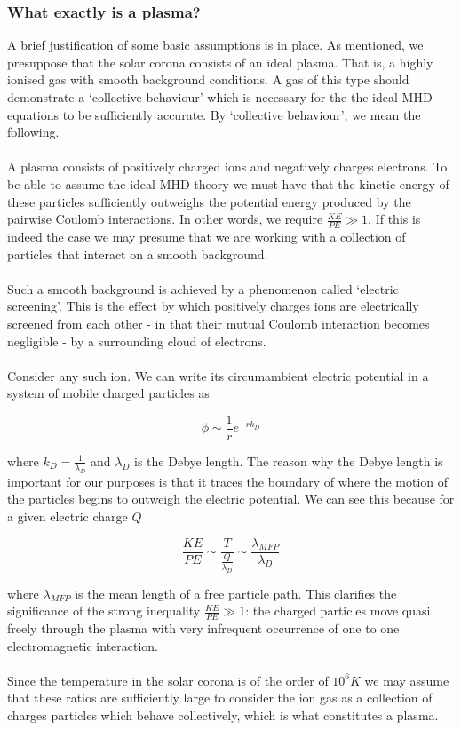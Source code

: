 \subsubsection{What exactly is a plasma?}

A brief justification of some basic assumptions is in place. As mentioned, we presuppose that the solar corona consists of an ideal plasma. That is, a highly ionised gas with smooth background conditions. A gas of this type should demonstrate a `collective behaviour' which is necessary for the the ideal MHD equations to be sufficiently accurate. By `collective behaviour', we mean the following.\\
\\
A plasma consists of positively charged ions and negatively charges electrons. To be able to assume the ideal MHD theory we must have that the kinetic energy of these particles sufficiently outweighs the potential energy produced by the pairwise Coulomb interactions. In other words, we require $\frac{KE}{PE} \gg 1$. If this is indeed the case we may presume that we are working with a collection of particles that interact on a smooth background.\\
\\
Such a smooth background is achieved by a phenomenon called `electric screening'. This is the effect by which positively charges ions are electrically screened from each other - in that their mutual Coulomb interaction becomes negligible - by a surrounding cloud of electrons.\\
\\
Consider any such ion. We can write its circumambient electric potential in a system of mobile charged particles as 

$$ \phi  \sim \frac{1}{r} e^{-r k_D}$$

where $k_D = \frac{1}{\lambda_D}$ and $ \lambda_D $ is the Debye length. The reason why the Debye length is important for our purposes is that it traces the boundary of where the motion of the particles begins to outweigh the electric potential. We can see this because for a given electric charge $Q$ 

$$ \frac{KE}{PE}  \sim \frac{T}{\frac{Q}{\lambda_D}}  \sim \frac{\lambda_{MFP}}{\lambda_D} $$

where $\lambda_{MFP}$ is the mean length of a free particle path. This clarifies the significance of the strong inequality $\frac{KE}{PE} \gg 1$: the charged particles move quasi freely through the plasma with very infrequent occurrence of one to one electromagnetic interaction.\\
\\
Since the temperature in the solar corona is of the order of $10^6 K$ we may assume that these ratios are sufficiently large to consider the ion gas as a collection of charges particles which behave collectively, which is what constitutes a plasma. \cite{notes-principles-MHD}

